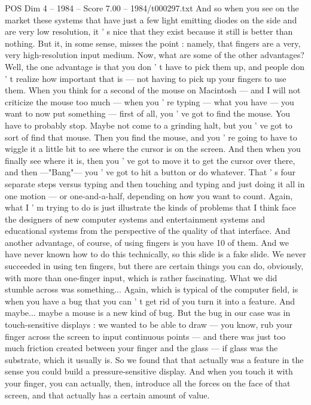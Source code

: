 \begin{textsample}{POS Dim 4 – 1984 – Score 7.00 – 1984/t000297.txt}
And so when you see on the market these systems that have just a few light emitting diodes on the side and are very low resolution, it ' s nice that they exist because it still is better than nothing.
But it, in some sense, misses the point : namely, that fingers are a very, very high-resolution input medium.
Now, what are some of the other advantages?
Well, the one advantage is that you don ' t have to pick them up, and people don ' t realize how important that is — not having to pick up your fingers to use them.
When you think for a second of the mouse on Macintosh — and I will not criticize the mouse too much — when you ' re typing — what you have — you want to now put something — first of all, you ' ve got to find the mouse.
You have to probably stop.
Maybe not come to a grinding halt, but you ' ve got to sort of find that mouse.
Then you find the mouse, and you ' re going to have to wiggle it a little bit to see where the cursor is on the screen.
And then when you finally see where it is, then you ' ve got to move it to get the cursor over there, and then —"Bang"— you ' ve got to hit a button or do whatever.
That ' s four separate steps versus typing and then touching and typing and just doing it all in one motion — or one-and-a-half, depending on how you want to count.
Again, what I ' m trying to do is just illustrate the kinds of problems that I think face the designers of new computer systems and entertainment systems and educational systems from the perspective of the quality of that interface.
And another advantage, of course, of using fingers is you have 10 of them.
And we have never known how to do this technically, so this slide is a fake slide.
We never succeeded in using ten fingers, but there are certain things you can do, obviously, with more than one-finger input, which is rather fascinating.
What we did stumble across was something...
Again, which is typical of the computer field, is when you have a bug that you can ' t get rid of you turn it into a feature.
And maybe... maybe a mouse is a new kind of bug.
But the bug in our case was in touch-sensitive displays : we wanted to be able to draw — you know, rub your finger across the screen to input continuous points — and there was just too much friction created between your finger and the glass — if glass was the substrate, which it usually is.
So we found that that actually was a feature in the sense you could build a pressure-sensitive display.
And when you touch it with your finger, you can actually, then, introduce all the forces on the face of that screen, and that actually has a certain amount of value.

\end{textsample}
